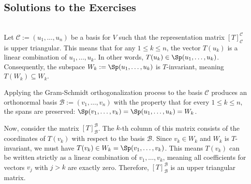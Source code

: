 \subsection{Solutions to the Exercises}
\label{sec:solutions_spectral_theorems}

\begin{exercisesolution}
\label{sol:gram_schmidt_keeps_triangular}~\\
Let $\mathcal{C} := (u_1, \dots, u_n)$ be a basis for $V$ such that the representation matrix $[T]_{\mathcal{C}}^{\mathcal{C}}$ is upper triangular. This means that for any $1 \leq k \leq n$, the vector $T(u_k)$ is a linear combination of $u_1, \dots, u_k$. In other words, $T(u_k) \in \Sp(u_1, \dots, u_k)$. Consequently, the subspace $W_k := \Sp(u_1, \dots, u_k)$ is $T$-invariant, meaning $T(W_k) \subseteq W_k$.

Applying the Gram-Schmidt orthogonalization process to the basis $\mathcal{C}$ produces an orthonormal basis $\mathcal{B} := (v_1, \dots, v_n)$ with the property that for every $1 \leq k \leq n$, the spans are preserved: $\Sp(v_1, \dots, v_k) = \Sp(u_1, \dots, u_k) = W_k$. 

Now, consider the matrix $[T]_{\mathcal{B}}^{\mathcal{B}}$. The $k$-th column of this matrix consists of the coordinates of $T(v_k)$ with respect to the basis $\mathcal{B}$. Since $v_k \in W_k$ and $W_k$ is $T$-invariant, we must have $T(v_k) \in W_k = \Sp(v_1, \dots, v_k)$. This means $T(v_k)$ can be written strictly as a linear combination of $v_1, \dots, v_k$, meaning all coefficients for vectors $v_j$ with $j > k$ are exactly zero. Therefore, $[T]_{\mathcal{B}}^{\mathcal{B}}$ is an upper triangular matrix.
\end{exercisesolution}

